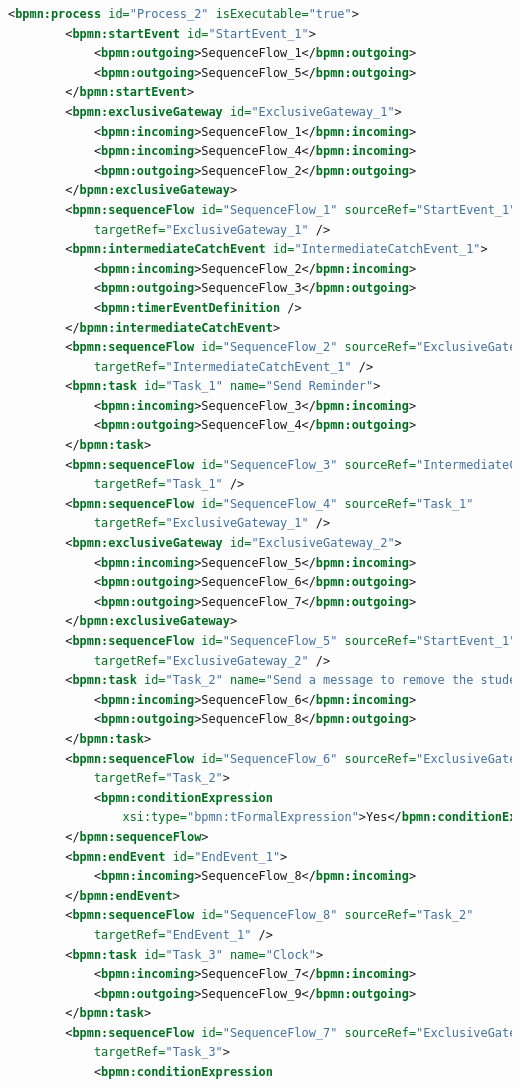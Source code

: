 \documentclass[runningheads]{llncs}
\begin{document}
	\begin{lstlisting}[language={XML}]
	<bpmn:process id="Process_2" isExecutable="true">
		<bpmn:startEvent id="StartEvent_1">
	        <bpmn:outgoing>SequenceFlow_1</bpmn:outgoing>
			<bpmn:outgoing>SequenceFlow_5</bpmn:outgoing>
	    </bpmn:startEvent>
		<bpmn:exclusiveGateway id="ExclusiveGateway_1">
			<bpmn:incoming>SequenceFlow_1</bpmn:incoming>
			<bpmn:incoming>SequenceFlow_4</bpmn:incoming>
			<bpmn:outgoing>SequenceFlow_2</bpmn:outgoing>
		</bpmn:exclusiveGateway>
		<bpmn:sequenceFlow id="SequenceFlow_1" sourceRef="StartEvent_1"
	        targetRef="ExclusiveGateway_1" />
		<bpmn:intermediateCatchEvent id="IntermediateCatchEvent_1">
			<bpmn:incoming>SequenceFlow_2</bpmn:incoming>
			<bpmn:outgoing>SequenceFlow_3</bpmn:outgoing>
			<bpmn:timerEventDefinition />
		</bpmn:intermediateCatchEvent>
		<bpmn:sequenceFlow id="SequenceFlow_2" sourceRef="ExclusiveGateway_1"
	        targetRef="IntermediateCatchEvent_1" />
		<bpmn:task id="Task_1" name="Send Reminder">
	        <bpmn:incoming>SequenceFlow_3</bpmn:incoming>
	        <bpmn:outgoing>SequenceFlow_4</bpmn:outgoing>
	    </bpmn:task>
		<bpmn:sequenceFlow id="SequenceFlow_3" sourceRef="IntermediateCatchEvent_1"
	        targetRef="Task_1" />
		<bpmn:sequenceFlow id="SequenceFlow_4" sourceRef="Task_1"
	        targetRef="ExclusiveGateway_1" />
		<bpmn:exclusiveGateway id="ExclusiveGateway_2">
			<bpmn:incoming>SequenceFlow_5</bpmn:incoming>
			<bpmn:outgoing>SequenceFlow_6</bpmn:outgoing>
			<bpmn:outgoing>SequenceFlow_7</bpmn:outgoing>
		</bpmn:exclusiveGateway>
		<bpmn:sequenceFlow id="SequenceFlow_5" sourceRef="StartEvent_1"
	        targetRef="ExclusiveGateway_2" />
		<bpmn:task id="Task_2" name="Send a message to remove the student from the self-study room">
	        <bpmn:incoming>SequenceFlow_6</bpmn:incoming>
	        <bpmn:outgoing>SequenceFlow_8</bpmn:outgoing>
	    </bpmn:task>
		<bpmn:sequenceFlow id="SequenceFlow_6" sourceRef="ExclusiveGateway_2"
			targetRef="Task_2">
			<bpmn:conditionExpression
				xsi:type="bpmn:tFormalExpression">Yes</bpmn:conditionExpression>
		</bpmn:sequenceFlow>
		<bpmn:endEvent id="EndEvent_1">
			<bpmn:incoming>SequenceFlow_8</bpmn:incoming>
		</bpmn:endEvent>
		<bpmn:sequenceFlow id="SequenceFlow_8" sourceRef="Task_2"
	        targetRef="EndEvent_1" />
		<bpmn:task id="Task_3" name="Clock">
	        <bpmn:incoming>SequenceFlow_7</bpmn:incoming>
	        <bpmn:outgoing>SequenceFlow_9</bpmn:outgoing>
	    </bpmn:task>
		<bpmn:sequenceFlow id="SequenceFlow_7" sourceRef="ExclusiveGateway_2"
			targetRef="Task_3">
			<bpmn:conditionExpression

\end{lstlisting}
\end{document}
